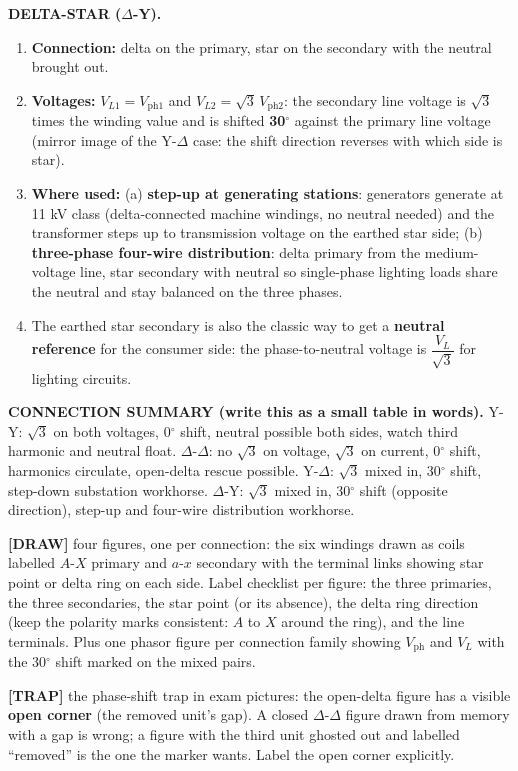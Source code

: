 \documentclass[11pt]{article}
\newcommand{\tagline}[1]{\textbf{\color{copper}#1}}
\newcommand{\drawline}[1]{\textbf{\color{muted}[DRAW]} #1}
\newcommand{\trap}[1]{\vspace{2pt}\textbf{\color{red}[TRAP]} #1}
\begin{document}
\tagline{DELTA-STAR ($\Delta$-Y).}
\begin{enumerate}[label=\arabic*.]
\item \textbf{Connection:} delta on the primary, star on the secondary with the neutral brought out.
\item \textbf{Voltages:} $V_{L1} = V_{\text{ph1}}$ and $V_{L2} = \sqrt{3}\,V_{\text{ph2}}$: the secondary line voltage is $\sqrt{3}$ times the winding value and is shifted \textbf{30$^\circ$} against the primary line voltage (mirror image of the Y-$\Delta$ case: the shift direction reverses with which side is star).
\item \textbf{Where used:} (a) \textbf{step-up at generating stations}: generators generate at 11 kV class (delta-connected machine windings, no neutral needed) and the transformer steps up to transmission voltage on the earthed star side; (b) \textbf{three-phase four-wire distribution}: delta primary from the medium-voltage line, star secondary with neutral so single-phase lighting loads share the neutral and stay balanced on the three phases.
\item The earthed star secondary is also the classic way to get a \textbf{neutral reference} for the consumer side: the phase-to-neutral voltage is $\dfrac{V_L}{\sqrt{3}}$ for lighting circuits.
\end{enumerate}

\tagline{CONNECTION SUMMARY (write this as a small table in words).} Y-Y: $\sqrt{3}$ on both voltages, 0$^\circ$ shift, neutral possible both sides, watch third harmonic and neutral float. $\Delta$-$\Delta$: no $\sqrt{3}$ on voltage, $\sqrt{3}$ on current, 0$^\circ$ shift, harmonics circulate, open-delta rescue possible. Y-$\Delta$: $\sqrt{3}$ mixed in, 30$^\circ$ shift, step-down substation workhorse. $\Delta$-Y: $\sqrt{3}$ mixed in, 30$^\circ$ shift (opposite direction), step-up and four-wire distribution workhorse.

\drawline{four figures, one per connection: the six windings drawn as coils labelled $A$-$X$ primary and $a$-$x$ secondary with the terminal links showing star point or delta ring on each side. Label checklist per figure: the three primaries, the three secondaries, the star point (or its absence), the delta ring direction (keep the polarity marks consistent: $A$ to $X$ around the ring), and the line terminals. Plus one phasor figure per connection family showing $V_{\text{ph}}$ and $V_L$ with the 30$^\circ$ shift marked on the mixed pairs.}

\trap{the phase-shift trap in exam pictures: the open-delta figure has a visible \textbf{open corner} (the removed unit's gap). A closed $\Delta$-$\Delta$ figure drawn from memory with a gap is wrong; a figure with the third unit ghosted out and labelled ``removed'' is the one the marker wants. Label the open corner explicitly.}
\end{document}
